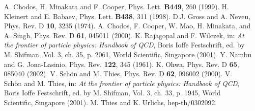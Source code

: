 \documentclass[a4paper,twocolumn,aps]{revtex4}
\begin{document}
\begin{references} 
A. Chodos, H. Minakata and F. Cooper, Phys. Lett. {\bf B449}, 260 (1999).
H. Kleinert and E. Babaev, Phys. Lett. {\bf B438}, 311 (1998).
D.J. Gross and A. Neveu, Phys. Rev. D {\bf 10}, 3235 (1974).
A. Chodos, F. Cooper, W. Mao, H. Minakata, and A. Singh, Phys. Rev. D {\bf 61}, 045011 (2000).
K. Rajagopal and F. Wilczek, in: {\em At the frontier of particle physics: Handbook of QCD}, 
Boris Ioffe Festschrift, ed. by M. Shifman, Vol. 3, ch. 35, p. 2061, World Scientific,
Singapore (2001).
Y. Nambu and G. Jona-Lasinio, Phys. Rev. {\bf 122}, 345 (1961).
K. Ohwa, Phys. Rev. D {\bf 65}, 085040 (2002).
V. Sch\"on and M. Thies, Phys. Rev. D {\bf 62}, 096002 (2000).
V. Sch\"on and M. Thies, in: {\em At the frontier of particle physics: Handbook of QCD}, 
Boris Ioffe Festschrift, ed. by M. Shifman, Vol. 3, ch. 33, p. 1945, World Scientific,
Singapore (2001).
M. Thies and K. Urlichs, hep-th/0302092.
\end{references} 
\end{document}
